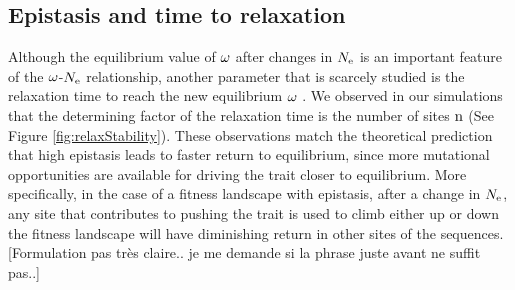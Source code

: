 \documentclass{article}
\begin{document}
	\subsection*{Epistasis and time to relaxation}
	Although the equilibrium value of $\omega$ after changes in $N_{\mathrm{e}}$ is an important feature of the $\omega$-$N_{\mathrm{e}}$ relationship, another parameter that is scarcely studied is the relaxation time to reach the new equilibrium $\omega$ \cite{Jones2016}.
	We observed in our simulations that the determining factor of the relaxation time is the number of sites $\text{n}$ (See Figure \ref{fig:relaxStability}).
	These observations match the theoretical prediction that high epistasis leads to faster return to equilibrium, since more mutational opportunities are available for driving the trait closer to equilibrium.
	More specifically, in the case of a fitness landscape with epistasis, after a change in $N_{\mathrm{e}}$, any site that contributes to pushing the trait is used to climb either up or down the fitness landscape will have diminishing return in other sites of the sequences. [Formulation pas très claire.. je me demande si la phrase juste avant ne suffit pas..]
	
\end{document}
